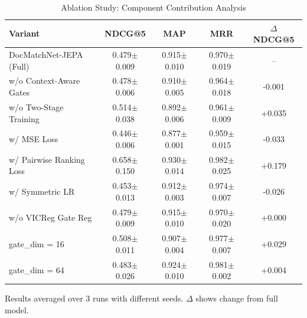 \begin{table}[t]
\centering
\caption{Ablation Study: Component Contribution Analysis}
\label{tab:ablation}
\begin{tabular}{@{}lccc|c@{}}
\toprule
\textbf{Variant} & \textbf{NDCG@5} & \textbf{MAP} & \textbf{MRR} & \textbf{$\Delta$ NDCG@5} \\
\midrule
DocMatchNet-JEPA (Full) & 0.479$\pm$0.009 & 0.915$\pm$0.010 & 0.970$\pm$0.019 & -- \\
\midrule
\quad w/o Context-Aware Gates & 0.478$\pm$0.006 & 0.910$\pm$0.005 & 0.964$\pm$0.018 & -0.001 \\
\quad w/o Two-Stage Training & 0.514$\pm$0.038 & 0.892$\pm$0.006 & 0.961$\pm$0.009 & +0.035 \\
\quad w/ MSE Loss & 0.446$\pm$0.006 & 0.877$\pm$0.001 & 0.959$\pm$0.015 & -0.033 \\
\quad w/ Pairwise Ranking Loss & 0.658$\pm$0.150 & 0.930$\pm$0.014 & 0.982$\pm$0.025 & +0.179 \\
\quad w/ Symmetric LR & 0.453$\pm$0.013 & 0.912$\pm$0.003 & 0.974$\pm$0.007 & -0.026 \\
\quad w/o VICReg Gate Reg & 0.479$\pm$0.009 & 0.915$\pm$0.010 & 0.970$\pm$0.020 & +0.000 \\
\quad gate\_dim = 16 & 0.508$\pm$0.011 & 0.907$\pm$0.004 & 0.977$\pm$0.007 & +0.029 \\
\quad gate\_dim = 64 & 0.483$\pm$0.026 & 0.924$\pm$0.010 & 0.981$\pm$0.002 & +0.004 \\
\bottomrule
\end{tabular}
\vspace{2mm}
\footnotesize{Results averaged over 3 runs with different seeds. $\Delta$ shows change from full model.}
\end{table}